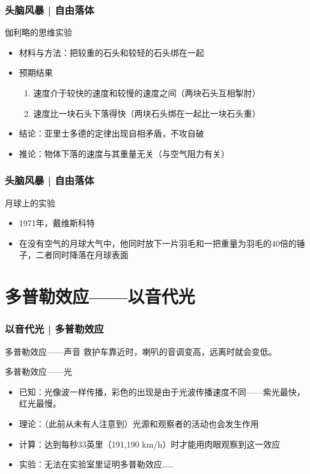 \begin{frame}
  \frametitle{头脑风暴 | 自由落体}
  \begin{block}{伽利略的思维实验}
    \begin{itemize}
      \item 材料与方法：把较重的石头和较轻的石头绑在一起
      \pause
      \item 预期结果
        \begin{enumerate}
          \item 速度介于较快的速度和较慢的速度之间（两块石头互相掣肘）
          \item 速度比一块石头下落得快（两块石头绑在一起比一块石头重）
        \end{enumerate}
      \item 结论：亚里士多德的定律出现自相矛盾，不攻自破
      \item 推论：物体下落的速度与其重量无关（与空气阻力有关）
    \end{itemize}
  \end{block}
\end{frame}

\begin{frame}
  \frametitle{头脑风暴 | 自由落体}
  \begin{block}{月球上的实验}
    \begin{itemize}
      \item 1971年，戴维\textbullet 斯科特
      \item 在没有空气的月球大气中，他同时放下一片羽毛和一把重量为羽毛的40倍的锤子，二者同时降落在月球表面
    \end{itemize}
  \end{block}
\end{frame}

\section{多普勒效应——以音代光}
\begin{frame}
  \frametitle{以音代光 | 多普勒效应}
  \begin{block}{多普勒效应——声音}
    救护车靠近时，喇叭的音调变高，远离时就会变低。
  \end{block}
  \pause
  \begin{block}{多普勒效应——光}
    \begin{itemize}
      \item 已知：光像波一样传播，彩色的出现是由于光波传播速度不同——紫光最快，红光最慢。
      \item 理论：（此前从未有人注意到）光源和观察者的活动也会发生作用
      \item 计算：达到每秒33英里（191,190 km/h）时才能用肉眼观察到这一效应
      \item 实验：无法在实验室里证明多普勒效应……
    \end{itemize}
  \end{block}
\end{frame}

